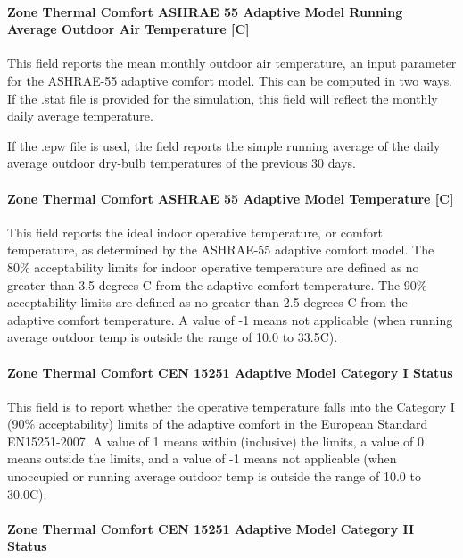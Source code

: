 \paragraph{Zone Thermal Comfort ASHRAE 55 Adaptive Model Running Average Outdoor Air Temperature {[}C{]}}\label{zone-thermal-comfort-ashrae-55-adaptive-model-running-average-outdoor-air-temperature-c}

This field reports the mean monthly outdoor air temperature, an input parameter for the ASHRAE-55 adaptive comfort model. This can be computed in two ways. If the .stat file is provided for the simulation, this field will reflect the monthly daily average temperature.

If the .epw file is used, the field reports the simple running average of the daily average outdoor dry-bulb temperatures of the previous 30 days.

\paragraph{Zone Thermal Comfort ASHRAE 55 Adaptive Model Temperature {[}C{]}}\label{zone-thermal-comfort-ashrae-55-adaptive-model-temperature-c}

This field reports the ideal indoor operative temperature, or comfort temperature, as determined by the ASHRAE-55 adaptive comfort model. The 80\% acceptability limits for indoor operative temperature are defined as no greater than 3.5 degrees C from the adaptive comfort temperature. The 90\% acceptability limits are defined as no greater than 2.5 degrees C from the adaptive comfort temperature. A value of -1 means not applicable (when running average outdoor temp is outside the range of 10.0 to 33.5C).

\paragraph{Zone Thermal Comfort CEN 15251 Adaptive Model Category I Status}\label{zone-thermal-comfort-cen-15251-adaptive-model-category-i-status}

This field is to report whether the operative temperature falls into the Category I (90\% acceptability) limits of the adaptive comfort in the European Standard EN15251-2007. A value of 1 means within (inclusive) the limits, a value of 0 means outside the limits, and a value of -1 means not applicable (when unoccupied or running average outdoor temp is outside the range of 10.0 to 30.0C).

\paragraph{Zone Thermal Comfort CEN 15251 Adaptive Model Category II Status}\label{zone-thermal-comfort-cen-15251-adaptive-model-category-ii-status}

